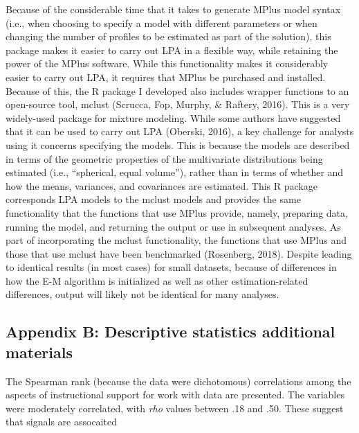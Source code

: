 \documentclass[]{msu-thesis}
\theoremstyle{definition}
\theoremstyle{definition}
\theoremstyle{definition}
\theoremstyle{remark}
\begin{document}
Because of the considerable time that it takes to generate MPlus model
syntax (i.e., when choosing to specify a model with different parameters
or when changing the number of profiles to be estimated as part of the
solution), this package makes it easier to carry out LPA in a flexible
way, while retaining the power of the MPlus software. While this
functionality makes it considerably easier to carry out LPA, it requires
that MPlus be purchased and installed. Because of this, the R package I
developed also includes wrapper functions to an open-source tool, mclust
(Scrucca, Fop, Murphy, \& Raftery, 2016). This is a very widely-used
package for mixture modeling. While some authors have suggested that it
can be used to carry out LPA (Oberski, 2016), a key challenge for
analysts using it concerns specifying the models. This is because the
models are described in terms of the geometric properties of the
multivariate distributions being estimated (i.e., ``spherical, equal
volume''), rather than in terms of whether and how the means, variances,
and covariances are estimated. This R package corresponds LPA models to
the mclust models and provides the same functionality that the functions
that use MPlus provide, namely, preparing data, running the model, and
returning the output or use in subsequent analyses. As part of
incorporating the mclust functionality, the functions that use MPlus and
those that use mclust have been benchmarked (Rosenberg, 2018). Despite
leading to identical results (in most cases) for small datasets, because
of differences in how the E-M algorithm is initialized as well as other
estimation-related differences, output will likely not be identical for
many analyses.

\subsection{Appendix B: Descriptive statistics additional
materials}\label{appendix-b-descriptive-statistics-additional-materials}

The Spearman rank (because the data were dichotomous) correlations among
the aspects of instructional support for work with data are presented.
The variables were moderately correlated, with \emph{rho} values between
.18 and .50. These suggest that signals are assocaited
\end{document}
